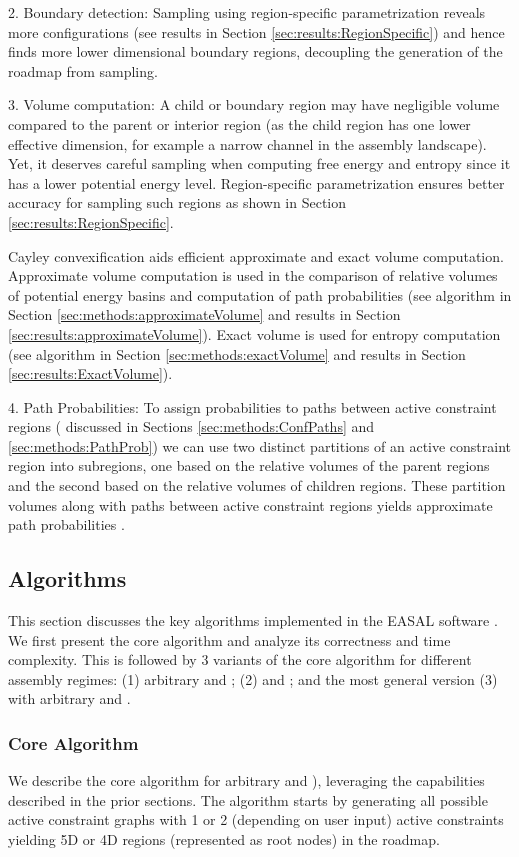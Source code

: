 \documentclass[]{article}
\newcommand{\rahul}[1]{\color{black}{#1}\color{black}}
\begin{document}
2. Boundary detection:
Sampling using region-specific parametrization reveals more configurations (see
results in Section \ref{sec:results:RegionSpecific}) and hence finds more lower
dimensional boundary regions, decoupling the generation of the roadmap from
sampling. 

3. Volume computation: A child or boundary region may have negligible volume
compared to the parent or interior region (as the child region has one lower
effective dimension, for example a narrow channel in the assembly landscape).
Yet, it deserves careful sampling when computing free energy and entropy since
it has a lower potential energy level.  Region-specific parametrization ensures
better accuracy for sampling such regions as shown in Section
\ref{sec:results:RegionSpecific}.

Cayley convexification aids efficient approximate and exact volume computation.
Approximate volume computation is used in the comparison of relative volumes of
potential energy basins and computation of path probabilities (see algorithm in
Section \ref{sec:methods:approximateVolume} and results in Section
\ref{sec:results:approximateVolume}). Exact volume is used for entropy
computation (see algorithm in Section \ref{sec:methods:exactVolume} and results
in Section \ref{sec:results:ExactVolume}).

4. Path Probabilities:
To assign probabilities to paths between active constraint regions (
discussed in Sections \ref{sec:methods:ConfPaths} and
\ref{sec:methods:PathProb}) we can use 
two distinct partitions of an active
constraint region into subregions, one based on the relative volumes of the
parent regions and the second based on the relative volumes of children
regions. These partition volumes along with paths between active constraint
regions yields approximate path probabilities .

\subsection{Algorithms}
\label{sec:algorithms}
This section discusses the key algorithms implemented in the EASAL software
\cite{Ozkan:toms, easalVideo, easalSoftware}. We first present the core
algorithm and analyze its correctness and time complexity. This is followed by
3 variants of the core algorithm for different assembly regimes: (1) arbitrary
 and ; (2)  and ; and the most general version (3) with
arbitrary  and .

\subsubsection{Core Algorithm}
\label{sec:coreAlgorithm}
We describe the core algorithm for arbitrary  and  \rahul{(Algorithm
\ref{alg:sampleAtlasNode} in Section \ref{sec:app:algorithm} of the Appendix}),
leveraging the capabilities described in the prior sections.  The algorithm
starts by generating all possible active constraint graphs with 1 or 2
(depending on user input) active constraints yielding 5D or 4D regions
(represented as root nodes) in the roadmap.
\end{document}

